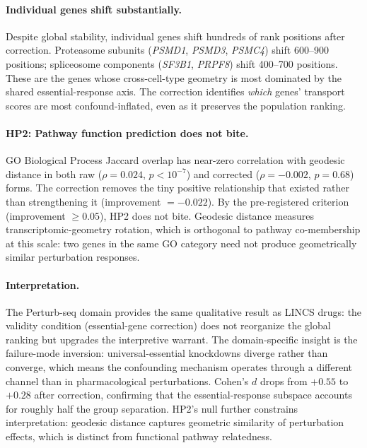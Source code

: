 \documentclass{article}
\begin{document}
\paragraph{Individual genes shift substantially.}
Despite global stability, individual genes shift hundreds of rank positions
after correction. Proteasome subunits (\emph{PSMD1}, \emph{PSMD3},
\emph{PSMC4}) shift 600--900 positions; spliceosome components
(\emph{SF3B1}, \emph{PRPF8}) shift 400--700 positions. These are the genes
whose cross-cell-type geometry is most dominated by the shared
essential-response axis. The correction identifies \emph{which} genes'
transport scores are most confound-inflated, even as it preserves the
population ranking.

\paragraph{HP2: Pathway function prediction does not bite.}
GO Biological Process Jaccard overlap has near-zero correlation with geodesic
distance in both raw ($\rho = 0.024$, $p < 10^{-7}$) and corrected ($\rho =
-0.002$, $p = 0.68$) forms. The correction removes the tiny positive
relationship that existed rather than strengthening it (improvement $=
-0.022$). By the pre-registered criterion (improvement $\geq 0.05$), HP2
does not bite. Geodesic distance measures transcriptomic-geometry rotation,
which is orthogonal to pathway co-membership at this scale: two genes in the
same GO category need not produce geometrically similar perturbation
responses.

\paragraph{Interpretation.}
The Perturb-seq domain provides the same qualitative result as LINCS drugs:
the validity condition (essential-gene correction) does not reorganize the
global ranking but upgrades the interpretive warrant. The domain-specific
insight is the failure-mode inversion: universal-essential knockdowns
diverge rather than converge, which means the confounding mechanism operates
through a different channel than in pharmacological perturbations. Cohen's $d$
drops from $+0.55$ to $+0.28$ after correction, confirming that the
essential-response subspace accounts for roughly half the group separation.
HP2's null further constrains interpretation: geodesic distance captures
geometric similarity of perturbation effects, which is distinct from
functional pathway relatedness.
\end{document}
